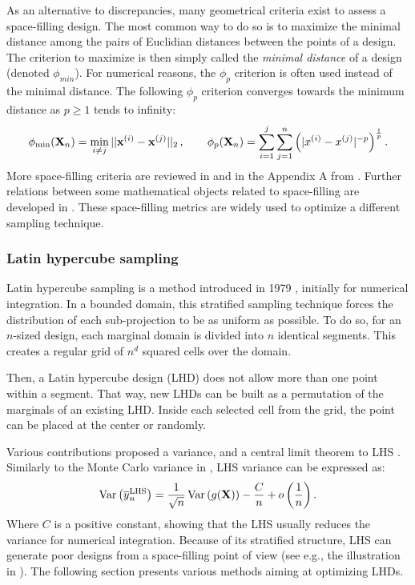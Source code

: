 As an alternative to discrepancies, many geometrical criteria exist to assess a space-filling design. 
The most common way to do so is to maximize the minimal distance among the pairs of Euclidian distances between the points of a design.  
The criterion to maximize is then simply called the \textit{minimal distance} of a design (denoted $\phi_{min}$). 
For numerical reasons, the $\phi_p$ criterion is often used instead of the minimal distance. 
The following $\phi_p$ criterion converges towards the minimum distance as $p\geq1$ tends to infinity:
\begin{equation} 
    \phi_{\min}({\bf X}_n) = \min_{i \neq j} ||{\bf x}^{(i)} - {\bf x}^{(j)}||_2\, , \qquad
    \phi_p({\bf X}_n) = \sum_{i=1}^{j} \sum_{j=1}^{n} \left( |x^{(i)} - x^{(j)}|^{-p} \right)^{\frac{1}{p}}.
\end{equation}
More space-filling criteria are reviewed in \citet{abtini_2018} and in the Appendix A from \citet{daveiga_iooss_2021}. 
Further relations between some mathematical objects related to space-filling are developed in \citet{pronzato_2012}. 
These space-filling metrics are widely used to optimize a different sampling technique.


\subsubsection{Latin hypercube sampling}
Latin hypercube sampling is a method introduced in 1979 \citep{mckay_beckman_1979}, initially for numerical integration. 
In a bounded domain, this stratified sampling technique forces the distribution of each sub-projection to be as uniform as possible. 
To do so, for an $n$-sized design, each marginal domain is divided into $n$ identical segments. 
This creates a regular grid of $n^{d}$ squared cells over the domain. 

Then, a Latin hypercube design (LHD) does not allow more than one point within a segment. 
That way, new LHDs can be built as a permutation of the marginals of an existing LHD. 
Inside each selected cell from the grid, the point can be placed at the center or randomly.

Various contributions proposed a variance, and a central limit theorem to LHS \citep{owen_1996}. 
Similarly to the Monte Carlo variance in , LHS variance can be expressed as:
\begin{equation}
    \operatorname{Var}\left(\overline{y}_n^{\textrm{LHS}}\right) = \frac{1}{\sqrt{n}} \operatorname{Var}\left(g({\bf X})\right) - \frac{C}{n} + o\left( \frac1n \right). 
\end{equation}
Where $C$ is a positive constant, showing that the LHS usually reduces the variance for numerical integration. 
Because of its stratified structure, LHS can generate poor designs from a space-filling point of view (see e.g., the illustration in ). 
The following section presents various methods aiming at optimizing LHDs.



